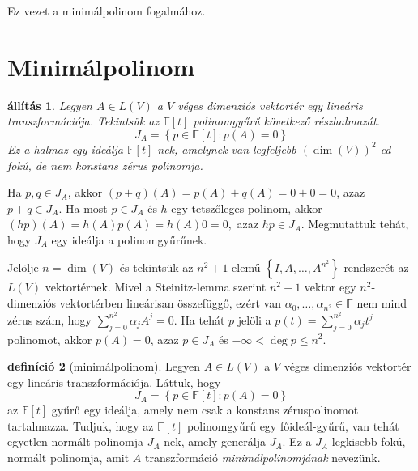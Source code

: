\documentclass[9pt, a4paper, showtrims]{memoir}
\makeatletter
\renewenvironment{proof}[1][\proofname]
    {\par\pushQED{\qed}%
    \normalfont \topsep6\p@\@plus6\p@\relax
    \trivlist
    \item[\hskip\labelsep
        \itshape
    #1\@addpunct{:}]\ignorespaces}
    {\popQED\endtrivlist\@endpefalse}
\theoremstyle{plain}
\newtheorem{proposition}{állítás}[chapter]
\theoremstyle{remark}
\theoremstyle{definition}
\newtheorem{definition}[proposition]{definíció}
\makeatother
\begin{document}
Ez vezet a minimálpolinom fogalmához.

\section{Minimálpolinom}
\begin{proposition}
	Legyen $A\in L\left( V \right)$ a $V$ véges dimenziós vektortér egy lineáris transzformációja.
	Tekintsük az
	$\mathbb{F}\left[ t \right]$ polinomgyűrű következő részhalmazát.
	\[
		J_{A}
		=
		\left\{ p\in\mathbb{F}\left[ t \right]:p\left( A \right)=0 \right\}
	\]
	Ez a halmaz egy ideálja $\mathbb{F}\left[ t \right]$-nek,
	amelynek van legfeljebb $\left( \dim(V) \right)^2$-ed fokú,
	de nem konstans zérus polinomja.
\end{proposition}
\begin{proof}
	Ha $p,q\in J_{A}$,
	akkor
	$\left( p+q \right)(A)=p\left( A \right)+q\left( A \right)=0+0=0$,
	azaz $p+q\in J_{A}$.
	Ha most $p\in J_{A}$ és $h$ egy tetszőleges polinom,
	akkor
	$
		\left( hp \right)(A)=h\left( A \right)p\left( A \right)=h\left( A \right)0=0,
	$
	azaz $hp\in J_{A}$.
	Megmutattuk tehát, hogy $J_{A}$ egy ideálja a polinomgyűrűnek.

	Jelölje $n=\dim(V)$ és tekintsük az $n^2+1$ elemű
	$\left\{ I,A,\ldots,A^{n^2} \right\}$ rendszerét az $L\left( V \right)$ vektortérnek.
	Mivel a Steinitz-lemma szerint 
	$n^2+1$ vektor egy $n^2$-dimenziós vektortérben lineárisan összefüggő,
	ezért van
	$\alpha_0,\ldots,\alpha_{n^2}\in\mathbb{F}$ nem mind zérus szám, hogy
	$\sum_{j=0}^{n^2}\alpha_jA^j=0$.
	Ha tehát $p$ jelöli a $p\left( t \right)=\sum_{j=0}^{n^2}\alpha_jt^j$ polinomot,
	akkor
	$p\left( A \right)=0$, azaz $p\in J_{A}$ és $-\infty<\deg p\leq n^2$.
\end{proof}
\begin{definition}[minimálpolinom]
	Legyen $A\in L\left( V \right)$ a $V$ véges dimenziós vektortér egy lineáris transzformációja.
	Láttuk, hogy
	\[
		J_{A}
		=
		\left\{ p\in\mathbb{F}\left[ t \right]:p\left( A \right)=0 \right\}
	\]
	az $\mathbb{F}\left[ t \right]$ gyűrű egy ideálja, amely nem csak a konstans zéruspolinomot tartalmazza.
	Tudjuk, hogy az $\mathbb{F}\left[ t \right]$ polinomgyűrű egy főideál-gyűrű,
	van tehát egyetlen normált polinomja $J_{A}$-nek, amely generálja $J_{A}$.
	Ez a $J_{A}$ legkisebb fokú, normált polinomja,
	amit $A$ transzformáció \emph{minimálpolinomjának} nevezünk.
\end{definition}
\end{document}
